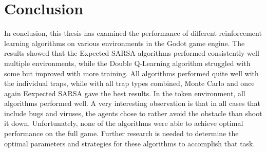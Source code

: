 \chapter*{Conclusion}

In conclusion, this thesis has examined the performance of different reinforcement learning algorithms on various environments in the Godot game engine.  The results showed that the Expected SARSA algorithms performed consistently well multiple environments, while the Double Q-Learning algorithm struggled with some but improved with more training. All algorithms performed quite well with the individual traps, while with all trap types combined, Monte Carlo and once again Eexpected SARSA gave the best results. In the token environment, all algorithms performed well. A very interesting observation is that in all cases that include bugs and viruses, the agents chose to rather avoid the obstacle than shoot it down. Unfortunately, none of the algorithms were able to achieve optimal performance on the full game. Further research is needed to determine the optimal parameters and strategies for these algorithms to accomplish that task.